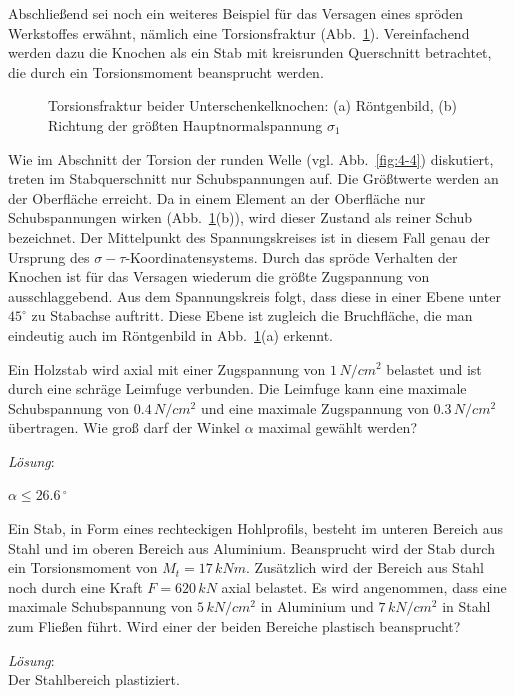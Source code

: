 Abschließend sei noch ein weiteres Beispiel für das Versagen eines spröden Werkstoffes erwähnt, nämlich eine Torsionsfraktur (Abb.~\ref{fig:5-13}).
Vereinfachend werden dazu die Knochen als ein Stab mit kreisrunden Querschnitt betrachtet, die durch ein Torsionsmoment beansprucht werden. 
%
\begin{figure}[h!]
	\centering
	
	\caption{Torsionsfraktur beider Unterschenkelknochen: (a) Röntgenbild, (b) Richtung der größten Hauptnormalspannung $\sigma_1$}
	\label{fig:5-13}
\end{figure}
%
Wie im Abschnitt der Torsion der runden Welle (vgl. Abb.~\ref{fig:4-4}) diskutiert, treten im Stabquerschnitt nur Schubspannungen auf.
Die Größtwerte werden an der Oberfläche erreicht.
Da in einem Element an der Oberfläche nur Schubspannungen wirken (Abb.~\ref{fig:5-13}(b)), wird dieser Zustand als reiner Schub bezeichnet.
Der Mittelpunkt des Spannungskreises ist in diesem Fall genau der Ursprung des $\sigma-\tau$-Koordinatensystems.
Durch das spröde Verhalten der Knochen ist für das Versagen wiederum die größte Zugspannung von ausschlaggebend.
Aus dem Spannungskreis folgt, dass diese in einer Ebene unter $45^\circ$ zu Stabachse auftritt.
Diese Ebene ist zugleich die Bruchfläche, die man eindeutig auch im Röntgenbild in Abb.~\ref{fig:5-13}(a) erkennt.

\FloatBarrier
\begin{example}
	Ein Holzstab wird axial mit einer Zugspannung von $1\,\unit{N/cm^2}$ belastet und ist durch eine schräge Leimfuge verbunden.
	Die Leimfuge kann eine maximale Schubspannung von $0.4\,\unit{N/cm^2}$ und eine maximale Zugspannung von $0.3\,\unit{N/cm^2}$ übertragen.
	Wie groß darf der Winkel $\alpha$ maximal gewählt werden? 
	\begin{center}
		
	\end{center}
	
	\textit{Lösung}:
	
	$\alpha\leq 26.6\,^\circ$
	
\end{example}

\begin{example}
	Ein Stab, in Form eines rechteckigen Hohlprofils, besteht im unteren Bereich aus Stahl und im oberen Bereich aus Aluminium.
	Beansprucht wird der Stab durch ein Torsionsmoment von $M_t = 
	17\,\unit{kNm}$.
	Zusätzlich wird der Bereich aus Stahl noch durch eine Kraft $F=620\,\unit{kN}$ axial belastet.
	Es wird angenommen, dass eine maximale Schubspannung von $5\,\unit{kN/cm^2}$ in Aluminium und $7\,\unit{kN/cm^2}$ in Stahl zum Fließen führt.
	Wird einer der beiden Bereiche plastisch beansprucht? 
	\begin{center}
		
	\end{center}
	
	\textit{Lösung}: \\
	Der Stahlbereich plastiziert.	
\end{example}

